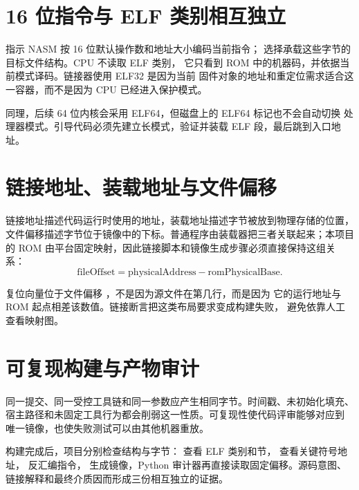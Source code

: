 \section{16 位指令与 ELF 类别相互独立}

 指示 NASM 按 16 位默认操作数和地址大小编码当前指令；
 选择承载这些字节的目标文件结构。CPU 不读取 ELF 类别，
它只看到 ROM 中的机器码，并依据当前模式译码。链接器使用 ELF32 是因为当前
固件对象的地址和重定位需求适合这一容器，而不是因为 CPU 已经进入保护模式。

同理，后续 64 位内核会采用 ELF64，但磁盘上的 ELF64 标记也不会自动切换
处理器模式。引导代码必须先建立长模式，验证并装载 ELF 段，最后跳到入口地址。

\section{链接地址、装载地址与文件偏移}

链接地址描述代码运行时使用的地址，装载地址描述字节被放到物理存储的位置，
文件偏移描述字节位于镜像中的下标。普通程序由装载器把三者关联起来；本项目
的 ROM 由平台固定映射，因此链接脚本和镜像生成步骤必须直接保持这组关系：
\[
  \mathrm{fileOffset} =
  \mathrm{physicalAddress} - \mathrm{romPhysicalBase}.
\]

复位向量位于文件偏移 ，不是因为源文件在第几行，而是因为
它的运行地址与 ROM 起点相差该数值。链接断言把这类布局要求变成构建失败，
避免依靠人工查看映射图。

\section{可复现构建与产物审计}

同一提交、同一受控工具链和同一参数应产生相同字节。时间戳、未初始化填充、
宿主路径和未固定工具行为都会削弱这一性质。可复现性使代码评审能够对应到
唯一镜像，也使失败测试可以由其他机器重放。

构建完成后，项目分别检查结构与字节： 查看 ELF 类别和节，
 查看关键符号地址， 反汇编指令，
 生成镜像，Python 审计器再直接读取固定偏移。源码意图、
链接解释和最终介质因而形成三份相互独立的证据。
